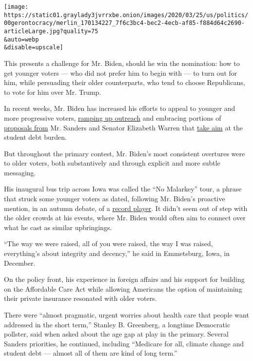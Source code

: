 \texttt{[image: https://static01.graylady3jvrrxbe.onion/images/2020/03/25/us/politics/00gerontocracy/merlin\_170134227\_7f6c3bc4-bec2-4ecb-af85-f884d64c2690-articleLarge.jpg?quality=75\\\&auto=webp\\\&disable=upscale]}

This presents a challenge for Mr. Biden, should he win the nomination:
how to get younger voters --- who did not prefer him to begin with ---
to turn out for him, while persuading their older counterparts, who tend
to choose Republicans, to vote for him over Mr. Trump.

In recent weeks, Mr. Biden has increased his efforts to appeal to
younger and more progressive voters,
\href{https://www.nytimes3xbfgragh.onion/2020/03/17/us/politics/joe-biden-democrats-liberals.html}{ramping
up outreach} and embracing portions of
\href{https://www.nytimes3xbfgragh.onion/2020/03/15/us/politics/biden-backs-free-college.html}{proposals
from} Mr. Sanders and Senator Elizabeth Warren that
\href{https://www.nytimes3xbfgragh.onion/2020/03/14/us/politics/biden-warren-bankruptcy.html}{take
aim} at the student debt burden.

But throughout the primary contest, Mr. Biden's most consistent
overtures were to older voters, both substantively and through explicit
and more subtle messaging.

His inaugural bus trip across Iowa was called the ``No Malarkey'' tour,
a phrase that struck some younger voters as dated, following Mr. Biden's
proactive mention, in an autumn debate, of a
\href{https://www.nytimes3xbfgragh.onion/2019/09/12/us/politics/biden-record-player.html}{record
player}. It didn't seem out of step with the older crowds at his events,
where Mr. Biden would often aim to connect over what he cast as similar
upbringings.

``The way we were raised, all of you were raised, the way I was raised,
everything's about integrity and decency,'' he said in Emmetsburg, Iowa,
in December.

On the policy front, his experience in foreign affairs and his support
for building on the Affordable Care Act while allowing Americans the
option of maintaining their private insurance resonated with older
voters.

There were ``almost pragmatic, urgent worries about health care that
people want addressed in the short term,'' Stanley B. Greenberg, a
longtime Democratic pollster, said when asked about the age gap at play
in the primary. Several Sanders priorities, he continued, including
``Medicare for all, climate change and student debt --- almost all of
them are kind of long term.''

